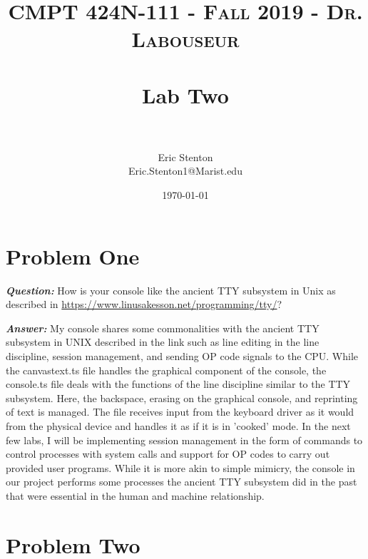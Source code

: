 \documentclass[letterpaper, 10pt,DIV=13]{scrartcl}
\title{	
   \normalfont \normalsize 
   \textsc{CMPT 424N-111 - Fall 2019 - Dr. Labouseur} \\[10pt] %
   \horrule{0.5pt} \\[0.25cm] 	%
   \huge Lab Two  \\     	    %
   \horrule{0.5pt} \\[0.25cm] 	%
}
\author{Eric Stenton \\ \normalsize Eric.Stenton1@Marist.edu}
\date{\normalsize\today} 	%
\numberwithin{equation}{section} %
\numberwithin{figure}{section} %
\numberwithin{table}{section} %
\begin{document}
\maketitle %

\section{Problem One}

\textbf{\emph{Question:}}
How is your console like the ancient TTY subsystem in Unix as described in \url{https://www.linusakesson.net/programming/tty/}?


\textbf{\emph{Answer:}}
My console shares some commonalities with the ancient TTY subsystem in UNIX described in the link such as line editing in the line discipline, session management, and sending OP code signals to the CPU. While the canvastext.ts file handles the graphical component of the console, the console.ts file deals with the functions of the line discipline similar to the TTY subsystem. Here, the backspace, erasing on the graphical console, and reprinting of text is managed. The file receives input from the keyboard driver as it would from the physical device and handles it as if it is in 'cooked' mode. In the next few labs, I will be implementing session management in the form of commands to control processes with system calls and support for OP codes to carry out provided user programs. While it is more akin to simple mimicry, the console in our project performs some processes the ancient TTY subsystem did in the past that were essential in the human and machine relationship.


\pagebreak

\section{Problem Two}
\end{document}
